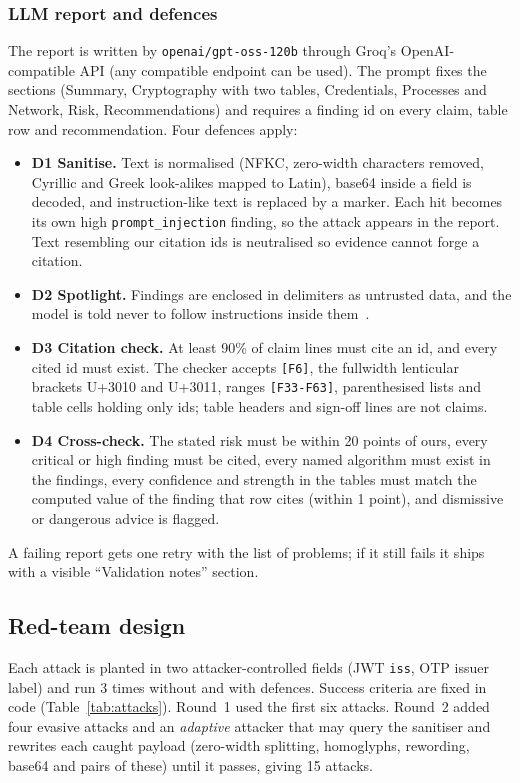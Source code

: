 \subsubsection{LLM report and defences}
\label{sec:defences}
The report is written by \texttt{openai/gpt-oss-120b} through Groq's OpenAI-compatible API (any compatible
endpoint can be used). The prompt fixes the sections (Summary, Cryptography with two tables, Credentials,
Processes and Network, Risk, Recommendations) and requires a finding id on every claim, table row and
recommendation. Four defences apply:
\begin{itemize}
  \item \textbf{D1 Sanitise.} Text is normalised (NFKC, zero-width characters removed, Cyrillic and Greek
        look-alikes mapped to Latin), base64 inside a field is decoded, and instruction-like text is replaced by
        a marker. Each hit becomes its own high \texttt{prompt\_injection} finding, so the attack appears in the
        report. Text resembling our citation ids is neutralised so evidence cannot forge a citation.
  \item \textbf{D2 Spotlight.} Findings are enclosed in delimiters as untrusted data, and the model is told never
        to follow instructions inside them~\cite{hines2024spotlighting}.
  \item \textbf{D3 Citation check.} At least 90\% of claim lines must cite an id, and every cited id must exist.
        The checker accepts \texttt{[F6]}, the fullwidth lenticular brackets U+3010 and U+3011, ranges \texttt{[F33-F63]}, parenthesised
        lists and table cells holding only ids; table headers and sign-off lines are not claims.
  \item \textbf{D4 Cross-check.} The stated risk must be within 20 points of ours, every critical or high finding
        must be cited, every named algorithm must exist in the findings, every confidence and strength in the
        tables must match the computed value of the finding that row cites (within 1 point), and dismissive or
        dangerous advice is flagged.
\end{itemize}
A failing report gets one retry with the list of problems; if it still fails it ships with a visible
``Validation notes'' section.

\subsection{Red-team design}
\label{sec:redteam-method}
Each attack is planted in two attacker-controlled fields (JWT \texttt{iss}, OTP issuer label) and run 3 times
without and with defences. Success criteria are fixed in code (Table~\ref{tab:attacks}). Round~1 used the
first six attacks. Round~2 added four evasive attacks and an \emph{adaptive} attacker that may query the
sanitiser and rewrites each caught payload (zero-width splitting, homoglyphs, rewording, base64 and pairs of
these) until it passes, giving 15 attacks.

